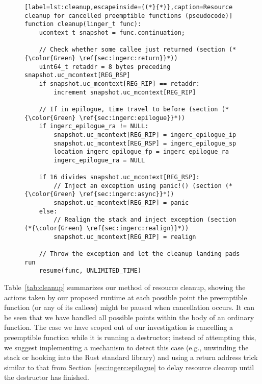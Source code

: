 \begin{figure}
\begin{lstlisting}[label=lst:cleanup,escapeinside={(*}{*)},caption=Resource cleanup for cancelled preemptible functions (pseudocode)]
function cleanup(linger_t func):
	ucontext_t snapshot = func.continuation;

	// Check whether some callee just returned (section (*{\color{Green} \ref{sec:ingerc:return}}*))
	uint64_t retaddr = 8 bytes preceding snapshot.uc_mcontext[REG_RSP]
	if snapshot.uc_mcontext[REG_RIP] == retaddr:
		increment snapshot.uc_mcontext[REG_RIP]

	// If in epilogue, time travel to before (section (*{\color{Green} \ref{sec:ingerc:epilogue}}*))
	if ingerc_epilogue_ra != NULL:
		snapshot.uc_mcontext[REG_RIP] = ingerc_epilogue_ip
		snapshot.uc_mcontext[REG_RSP] = ingerc_epilogue_sp
		location ingerc_epilogue_fp = ingerc_epilogue_ra
		ingerc_epilogue_ra = NULL

	if 16 divides snapshot.uc_mcontext[REG_RSP]:
		// Inject an exception using panic!() (section (*{\color{Green} \ref{sec:ingerc:async}}*))
		snapshot.uc_mcontext[REG_RIP] = panic
	else:
		// Realign the stack and inject exception (section (*{\color{Green} \ref{sec:ingerc:realign}}*))
		snapshot.uc_mcontext[REG_RIP] = realign

	// Throw the exception and let the cleanup landing pads run
	resume(func, UNLIMITED_TIME)
\end{lstlisting}
\end{figure}

Table~\ref{tab:cleanup} summarizes our method of resource cleanup, showing the
actions taken by our proposed runtime at each possible point the preemptible function
(or any of its callees) might be paused when cancellation occurs.  It can be seen
that we have handled all possible points within the body of an ordinary function.
The case we have scoped out of our investigation is cancelling a preemptible function
while it is running a destructor; instead of attempting this, we suggest implementing
a mechanism to detect this case (e.g., unwinding the stack or hooking into the Rust
standard library) and using a return address trick similar to that from
Section~\ref{sec:ingerc:epilogue} to delay resource cleanup until the destructor has
finished.

